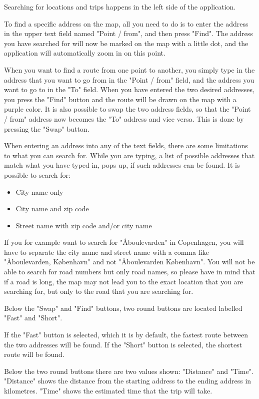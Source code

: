 Searching for locations and trips happens in the left side of the application.

To find a specific address on the map, all you need to do is to enter the address in the upper text field named "Point / from", and then press "Find". The address you have searched for will now be marked on the map with a little dot, and the application will automatically zoom in on this point.

When you want to find a route from one point to another, you simply type in the address that you want to go from in the "Point / from" field, and the address you want to go to in the "To" field. When you have entered the two desired addresses, you press the "Find" button and the route will be drawn on the map with a purple color. 
It is also possible to swap the two address fields, so that the "Point / from" address now becomes the "To" address and vice versa. This is done by pressing the "Swap" button.

When entering an address into any of the text fields, there are some limitations to what you can search for. While you are typing, a list of possible addresses that match what you have typed in, pops up, if such addresses can be found. It is possible to search for:
\begin{itemize}
	\item City name only
	\item City name and zip code
	\item Street name with zip code and/or city name
\end{itemize}
If you for example want to search for "\AA boulevarden" in Copenhagen, you will have to separate the city name and street name with a comma like "\AA boulevarden, K\o benhavn" and not "\AA boulevarden K\o benhavn". You will not be able to search for road numbers but only road names, so please have in mind that if a road is long, the map may not lead you to the exact location that you are searching for, but only to the road that you are searching for.

Below the "Swap" and "Find" buttons, two round buttons are located labelled "Fast" and "Short".

If the "Fast" button is selected, which it is by default, the fastest route between the two addresses will be found. If the "Short" button is selected, the shortest route will be found.

Below the two round buttons there are two values shown: "Distance" and "Time". "Distance" shows the distance from the starting address to the ending address in kilometres. "Time" shows the estimated time that the trip will take.

